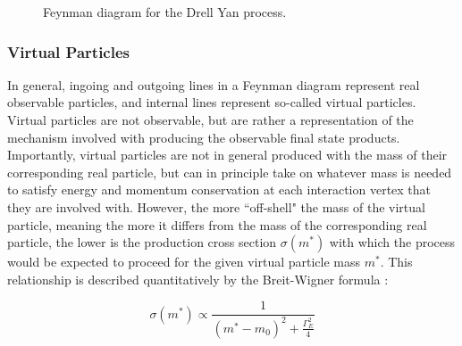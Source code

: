 \begin{figure}[h]
	\centering
	\caption{Feynman diagram for the Drell Yan process.}
	\label{fig:drell_yan}
\end{figure}

\subsubsection{Virtual Particles}
\label{sec:virtual_particles}

In general, ingoing and outgoing lines in a Feynman diagram represent real observable particles, and internal lines represent so-called virtual particles. Virtual particles are not observable, but are rather a representation of the mechanism involved with producing the observable final state products. Importantly, virtual particles are not in general produced with the mass of their corresponding real particle, but can in principle take on whatever mass is needed to satisfy energy and momentum conservation at each interaction vertex that they are involved with. However, the more ``off-shell" the mass of the virtual particle, meaning the more it differs from the mass of the corresponding real particle, the lower is the production cross section \(\sigma(m^{*})\) with which the process would be expected to proceed for the given virtual particle mass \(m^{*}\). This relationship is described quantitatively by the Breit-Wigner formula \cite{breit_wigner}:

\begin{equation}
\label{eq:breit_wigner}
\sigma(m^{*}) \propto \frac{1}{(m^{*}-m_0)^2 + \frac{\Gamma_E^2}{4}}
\end{equation}


